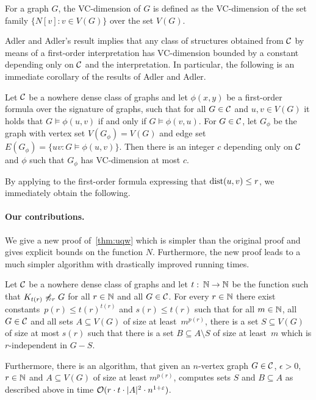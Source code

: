 For a graph $G$, the VC-dimension of $G$ is defined as the VC-dimension
of the set family $\{N[v]\colon v\in V(G)\}$ over the set $V(G)$.

Adler and Adler's result implies that any class of structures
obtained from $\mathcal{C}$ by means of a first-order interpretation has VC-dimension
bounded by a constant depending only on $\mathcal{C}$ and the interpretation.
In particular, the following is an immediate corollary of the results of Adler and Adler.

\begin{theorem}\label{thm:adler}
  Let $\mathcal{C}$ be a nowhere dense class of graphs and let $\phi(x,y)$ be
  a first-order formula over the signature of graphs,
  such that for all $G \in \mathcal{C}$ and $u,v\in
  V(G)$ it holds that $G\models\phi(u,v)$ if and only if $G\models\phi(v,u)$. 
  For $G\in \mathcal{C}$, let $G_\phi$ be the graph with
  vertex set $V(G_\phi)=V(G)$ and edge set $E(G_\phi)=\{uv \colon
  G\models\phi(u,v)\}$. Then there is an integer $c$ depending only on
  $\mathcal{C}$ and $\phi$ such that $G_\phi$ has VC-dimension at most $c$.
\end{theorem}

By applying  to the first-order formula 
expressing that $\mathrm{dist}(u,v)\leq r$,
we immediately obtain the following.


\paragraph{Our contributions.}

We give a new proof of~\cref{thm:uqw} which is simpler than 
the original proof and gives explicit bounds on the function $N$. 
Furthermore, the new proof leads to a much simpler algorithm 
with drastically improved running times.

\begin{theorem}\label{thm:new-uqw}
  Let $\mathcal{C}$ be a nowhere dense class of graphs and let 
  $t\,\colon\,\mathbb{N}\rightarrow \mathbb{N}$ be the function such that
  $K_{t(r)}\not\preccurlyeq_r G$ for all $r\in \mathbb{N}$ and all $G\in \mathcal{C}$.  
  For every $r\in \mathbb{N}$
  there exist constants~$p(r)\leq t(r)^{t(r)}$ and $s(r)\leq t(r)$ such that
  for all $m\in \mathbb{N}$, all $G\in\mathcal{C}$ and all sets $A\subseteq V(G)$ of size at 
  least~$m^{p(r)}$, there is a set $S\subseteq V(G)$ of size at
  most $s(r)$ such that there is a set $B\subseteq A\setminus S$ of size at
  least~$m$ which is $r$-independent in $G-S$.
  
  Furthermore, there is an algorithm, that given an $n$-vertex graph
  $G\in \mathcal{C}$, $\epsilon>0$, $r\in \mathbb{N}$ and $A\subseteq V(G)$ of size at least
  $m^{p(r)}$, computes sets $S$ and $B\subseteq A$ as described above
  in
  time $\mathcal{O}(r\cdot t\cdot |A|^2\cdot n^{1+\varepsilon})$.
\end{theorem}

